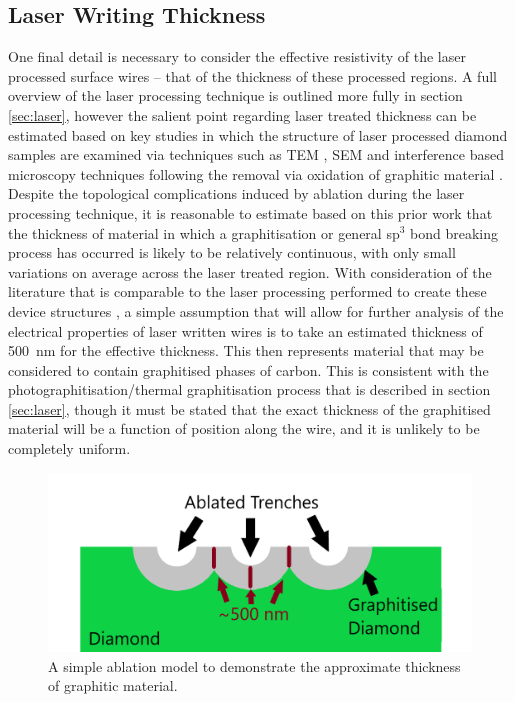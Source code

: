 \begin{refsection}
\subsection{Laser Writing Thickness}
\label{subsubsec:laser_writing_thickness}
One final detail is necessary to consider the effective resistivity of the laser processed surface wires -- that of the thickness of these processed regions. A full overview of the laser processing technique is outlined more fully in section \ref{sec:laser}, however the salient point regarding laser treated thickness can be estimated based on key studies in which the structure of laser processed diamond samples are examined via techniques such as TEM \cite{salter2017}, SEM \cite{ashikkalieva2022} and interference based microscopy techniques following the removal via oxidation of graphitic material \cite{kononenko2005}. Despite the topological complications induced by ablation during the laser processing technique, it is reasonable to estimate based on this prior work that the thickness of material in which a graphitisation or general sp$^{3}$ bond breaking process has occurred is likely to be relatively continuous, with only small variations on average across the laser treated region. With consideration of the literature that is comparable to the laser processing performed to create these device structures \cite{kononenko2005, Kononenko2009, kononenko:2015}, a simple assumption that will allow for further analysis of the electrical properties of laser written wires is to take an estimated thickness of 500~\si{\nano\metre} for the effective thickness. This then represents material that may be considered to contain graphitised phases of carbon. This is consistent with the photographitisation/thermal graphitisation process that is described in section \ref{sec:laser}, though it must be stated that the exact thickness of the graphitised material will be a function of position along the wire, and it is unlikely to be completely uniform. 

\begin{figure}[H]
    \centering
    \includegraphics[width=\linewidth]{Chapter7/Figs/Raster/simple_ablation_model_2.png}
    \caption{A simple ablation model to demonstrate the approximate thickness of graphitic material.}
    \label{fig:simple_ablation_model_2}
\end{figure}


\end{refsection}
